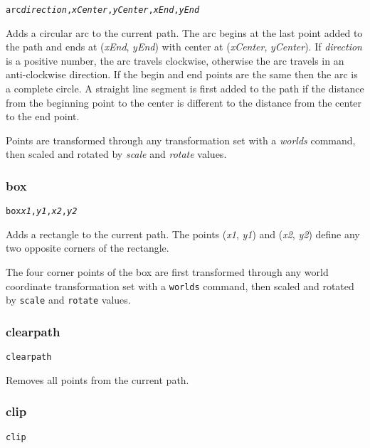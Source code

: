 \begin{alltt}
arc \textit{direction}, \textit{xCenter}, \textit{yCenter}, \textit{xEnd}, \textit{yEnd}
\end{alltt}

Adds a circular arc to the current path.  The arc begins at
the last point added to the path and ends at (\textit{xEnd}, \textit{yEnd})
with center at (\textit{xCenter}, \textit{yCenter}).
If \textit{direction} is a positive number, the arc travels clockwise,
otherwise the arc travels in an anti-clockwise direction.
If the begin and end points are the same then the arc is a complete circle.
A straight line segment is first added to the path if
the distance from the beginning point to the center is different
to the distance from the center to the end point.

Points are transformed through any
transformation set with a \textit{worlds} command,
then scaled and rotated by \textit{scale}
and \textit{rotate} values.

\subsubsection{box}

\begin{alltt}
box \textit{x1}, \textit{y1}, \textit{x2}, \textit{y2}
\end{alltt}

Adds a rectangle to the current path.
The points
(\textit{x1}, \textit{y1}) and (\textit{x2}, \textit{y2}) define
any two opposite corners of the rectangle.

The four corner points of the box
are first transformed through any world coordinate
transformation set with a \texttt{worlds} command,
then scaled and rotated by \texttt{scale}
and \texttt{rotate} values.

\subsubsection{clearpath}

\begin{alltt}
clearpath
\end{alltt}

Removes all points from the current path.

\subsubsection{clip}

\begin{alltt}
clip
\end{alltt}

